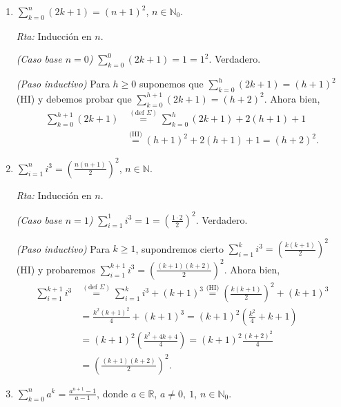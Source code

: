 \documentclass[a4paper,12pt,twoside,spanish,reqno]{amsbook}
\numberwithin{equation}{section}
\newcommand{\rta}{\noindent\textit{Rta: }}
\begin{document}
\begin{enumerate}
\begin{enumerate}
            \item  $\displaystyle{ \sum_{k=0}^n (2k+1) = (n+1)^2}$, $n\in \mathbb N_0$.
            
            \rta Inducción en $n$.
            
            \textit{(Caso base $n=0$) } $\sum_{k=0}^0 (2k+1) = 1 = 1^2$. Verdadero.
            
            \textit{(Paso inductivo) } Para $h \ge 0$ suponemos que $\sum_{k=0}^h (2k+1) = (h+1)^2$ (HI) y debemos probar que $\sum_{k=0}^{h+1} (2k+1) = (h+2)^2$. Ahora bien, 
            \begin{align*}
                \sum_{k=0}^{h+1} (2k+1) &\overset{(\text{def } \Sigma)}{=} \sum_{k=0}^h (2k+1) + 2(h+1) +1 \\ &\overset{\text{(HI)}}{=}  (h+1)^2 + 2(h+1) +1 = (h+2)^2.
            \end{align*}
            
            \item  $\displaystyle{ \sum_{i=1}^n i^3 = \left( \frac{n(n+1)}{2 }\right)^2}$, $n\in \mathbb N$.
            
            \rta Inducción en $n$.
            
            \textit{(Caso base $n=1$) } $\sum_{i=1}^1 i^3 = 1 = (\frac{1 \cdot 2}{2})^2$. Verdadero. 
            
            \textit{(Paso inductivo) } Para  $k \ge 1$,  supondremos cierto $\sum_{i=1}^k i^3 = \left( \frac{k(k+1)}{2 }\right)^2$ (HI) y probaremos $\sum_{i=1}^{k+1} i^3 = \left( \frac{(k+1)(k+2)}{2 }\right)^2$. Ahora bien,
            \begin{align*}
                \sum_{i=1}^{k+1} i^3 &\overset{(\text{def } \Sigma)}{=} \sum_{i=1}^k i^3 + (k+1)^3 \overset{\text{(HI)}}{=}  \left( \frac{k(k+1)}{2 }\right)^2 + (k+1)^3 \\
                &= \frac{k^2(k+1)^2}{4 } + (k+1)^3 = (k+1)^2 \left(\frac{k^2}{4 } + k+1 \right)\\
                &= (k+1)^2 \left(\frac{k^2+4k +4}{4 } \right) = (k+1)^2\frac{(k+2)^2}{4 } \\
                &= \left( \frac{(k+1)(k+2)}{2 }\right)^2.
            \end{align*}
            
            \item\label{ej-serie-geometrica}  $\displaystyle{ \sum_{k=0}^n a^k = \frac{a^{n+1}-1}{a-1}}$, donde $a\in {\mathbb R}$, $a \neq 0,\ 1$, $n\in \mathbb N_0$.
            

\end{enumerate}
\end{enumerate}
\end{document}
